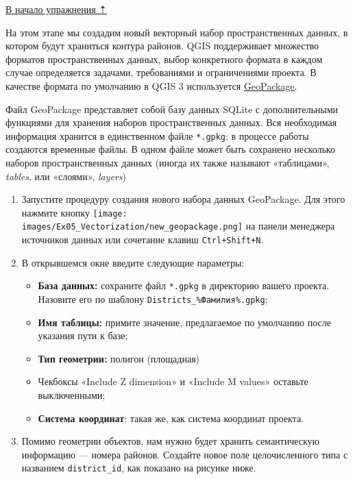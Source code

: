 \documentclass[
  12pt,
]{book}
\providecommand{\tightlist}{%
  \setlength{\itemsep}{0pt}\setlength{\parskip}{0pt}}
\begin{document}
\protect\hyperlink{digitizingf-districts}{В начало упражнения ⇡}

На этом этапе мы создадим новый векторный набор пространственных данных, в котором будут храниться контура районов. QGIS поддерживает множество форматов пространственных данных, выбор конкретного формата в каждом случае определяется задачами, требованиями и ограничениями проекта. В качестве формата по умолчанию в QGIS 3 используется \href{https://www.geopackage.org/}{GeoPackage}.

Файл GeoPackage представляет собой базу данных SQLite с дополнительными функциями для хранения наборов пространственных данных. Вся необходимая информация хранится в единственном файле \texttt{*.gpkg}; в процессе работы создаются временные файлы. В одном файле может быть сохранено несколько наборов пространственных данных (иногда их также называют «таблицами», \emph{tables}, или «слоями», \emph{layers})

\begin{enumerate}
\def\labelenumi{\arabic{enumi}.}
\item
  Запустите процедуру создания нового набора данных GeoPackage. Для этого нажмите кнопку \texttt{[image: images/Ex05\_Vectorization/new\_geopackage.png]} на панели менеджера источников данных или сочетание клавиш \texttt{Ctrl+Shift+N}.
\item
  В открывшемся окне введите следующие параметры:

  \begin{itemize}
  \tightlist
  \item
    \textbf{База данных:} сохраните файл \texttt{*.gpkg} в директорию вашего проекта. Назовите его по шаблону \texttt{Districts\_\%Фамилия\%.gpkg};
  \item
    \textbf{Имя таблицы:} примите значение, предлагаемое по умолчанию после указания пути к базе;
  \item
    \textbf{Тип геометрии:} полигон (площадная)
  \item
    Чекбоксы «Include Z dimension» и «Include M values» оставьте выключенными;
  \item
    \textbf{Система координат}: такая же, как система координат проекта.
  \end{itemize}
\item
  Помимо геометрии объектов, нам нужно будет хранить семантическую информацию --- номера районов. Создайте новое поле целочисленного типа с названием \texttt{district\_id}, как показано на рисунке ниже.
\end{enumerate}
\end{document}
